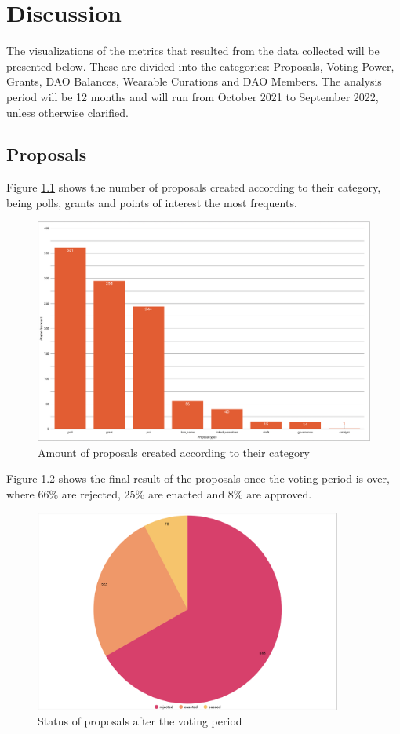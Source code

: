 \documentclass[MSE,Master,english]{twbook}%
\begin{document}
\chapter{Discussion\label{discussion}}
The visualizations of the metrics that resulted from the data collected will be presented below. These are divided into the categories: Proposals, Voting Power, Grants, \gls{DAO} Balances, Wearable Curations and \gls{DAO} Members. The analysis period will be 12 months and will run from October 2021 to September 2022, unless otherwise clarified.

\section{Proposals}
Figure \ref{fig:proposal_types} shows the number of proposals created according to their category, being polls, grants and points of interest the most frequents.
\begin{figure}[H]
  \centering
  \includegraphics[width=\textwidth]{metrics/proposal_types.png}
  \caption{Amount of proposals created according to their category}
  \label{fig:proposal_types}
\end{figure}

Figure \ref{fig:proposal_status} shows the final result of the proposals once the voting period is over, where 66\% are rejected, 25\% are enacted and 8\% are approved.
\begin{figure}[H]
  \centering
  \includegraphics[width=0.9\textwidth]{metrics/proposal_status.png}
  \caption{Status of proposals after the voting period}
  \label{fig:proposal_status}
\end{figure}
\end{document}
